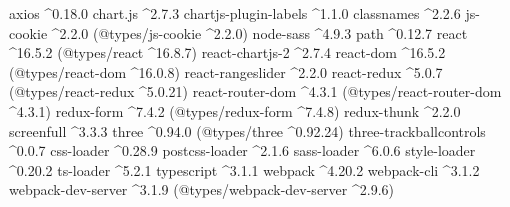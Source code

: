 \documentclass[a4paper,12pt]{article}
\begin{document}
\begin{code}
axios \textasciicircum0.18.0\newline
chart.js \textasciicircum2.7.3\newline
chartjs-plugin-labels \textasciicircum1.1.0\newline
classnames \textasciicircum2.2.6\newline
js-cookie \textasciicircum2.2.0 (@types/js-cookie \textasciicircum2.2.0)\newline
node-sass \textasciicircum4.9.3\newline
path \textasciicircum0.12.7\newline
react \textasciicircum16.5.2 (@types/react \textasciicircum16.8.7)\newline
react-chartjs-2 \textasciicircum2.7.4\newline
react-dom \textasciicircum16.5.2 (@types/react-dom \textasciicircum16.0.8)\newline
react-rangeslider \textasciicircum2.2.0\newline
react-redux \textasciicircum5.0.7 (@types/react-redux \textasciicircum5.0.21)\newline
react-router-dom \textasciicircum4.3.1 (@types/react-router-dom \textasciicircum4.3.1)\newline
redux-form \textasciicircum7.4.2 (@types/redux-form \textasciicircum7.4.8)\newline
redux-thunk \textasciicircum2.2.0\newline
screenfull \textasciicircum3.3.3\newline
three \textasciicircum0.94.0 (@types/three \textasciicircum0.92.24)\newline
three-trackballcontrols \textasciicircum0.0.7\newline
css-loader \textasciicircum0.28.9\newline
postcss-loader \textasciicircum2.1.6\newline
sass-loader \textasciicircum6.0.6\newline
style-loader \textasciicircum0.20.2\newline
ts-loader \textasciicircum5.2.1\newline
typescript \textasciicircum3.1.1\newline
webpack \textasciicircum4.20.2\newline
webpack-cli \textasciicircum3.1.2\newline
webpack-dev-server \textasciicircum3.1.9 (@types/webpack-dev-server \textasciicircum2.9.6)
\end{code}
\end{document}
